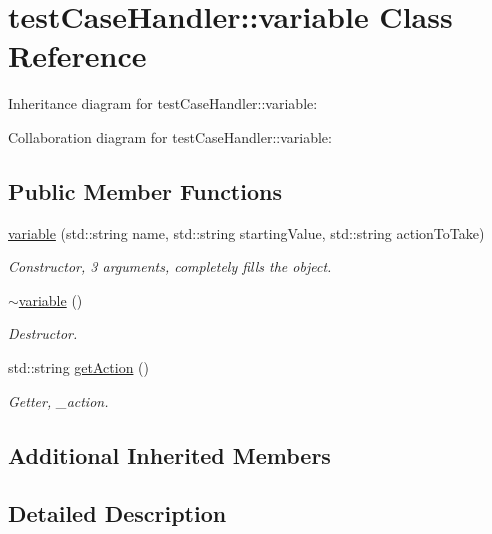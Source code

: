 \hypertarget{classtestCaseHandler_1_1variable}{}\section{test\+Case\+Handler\+::variable Class Reference}
\label{classtestCaseHandler_1_1variable}


Inheritance diagram for test\+Case\+Handler\+::variable\+:


Collaboration diagram for test\+Case\+Handler\+::variable\+:
\subsection*{Public Member Functions}
\begin{DoxyCompactItemize}
\item 
\mbox{\hyperlink{classtestCaseHandler_1_1variable_a3e37b23e38a3bde047454efb9d9dfcd3}{variable}} (std\+::string name, std\+::string starting\+Value, std\+::string action\+To\+Take)
\begin{DoxyCompactList}\small\item\em Constructor, 3 arguments, completely fills the object. \end{DoxyCompactList}\item 
\mbox{\label{classtestCaseHandler_1_1variable_af89fba1a16ab9610eece4a50b44c51df}} 
\mbox{\hyperlink{classtestCaseHandler_1_1variable_af89fba1a16ab9610eece4a50b44c51df}{$\sim$variable}} ()
\begin{DoxyCompactList}\small\item\em Destructor. \end{DoxyCompactList}\item 
std\+::string \mbox{\hyperlink{classtestCaseHandler_1_1variable_a5a5f58eb6a352550f512d3a2bb25f14d}{get\+Action}} ()
\begin{DoxyCompactList}\small\item\em Getter, \+\_\+action. \end{DoxyCompactList}\end{DoxyCompactItemize}
\subsection*{Additional Inherited Members}


\subsection{Detailed Description}


